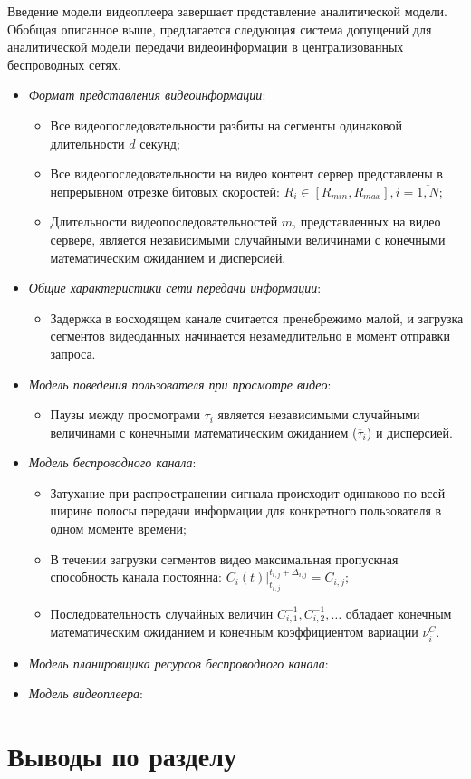 Введение модели видеоплеера завершает представление аналитической модели. Обобщая описанное выше, предлагается следующая система допущений для аналитической модели передачи видеоинформации в централизованных беспроводных сетях.
\begin{itemize}
	\item \textit{Формат представления видеоинформации}:
	\begin{itemize}
		\item Все видеопоследовательности разбиты на сегменты одинаковой длительности $d$ секунд;
		\item Все видеопоследовательности на видео контент сервер представлены в непрерывном отрезке битовых скоростей: \mbox{$R_i \in [R_{min}, R_{max}], i=\overline{1,N}$};
		\item Длительности видеопоследовательностей $m$, представленных на видео сервере, является независимыми случайными величинами с конечными математическим ожиданием и дисперсией.
	\end{itemize}
	\item \textit{Общие характеристики сети передачи информации}:
	\begin{itemize}
		\item Задержка в восходящем канале считается пренебрежимо малой, и загрузка сегментов видеоданных начинается незамедлительно в момент отправки запроса.
	\end{itemize}
	\item \textit{Модель поведения пользователя при просмотре видео}:
	\begin{itemize}
		\item Паузы между просмотрами $\tau_i$ является независимыми случайными величинами с конечными математическим ожиданием ($\overline{\tau}_i$) и дисперсией.
	\end{itemize}
	\item \textit{Модель беспроводного канала}:
	\begin{itemize}
		\item Затухание при распространении сигнала происходит одинаково по всей ширине полосы передачи информации для конкретного пользователя в одном моменте времени;
		\item В течении загрузки сегментов видео максимальная пропускная способность канала постоянна: $\left.C_i(t)\right\vert^{t_{i,j}+\Delta_{i,j}}_{t_{i,j}}=C_{i,j}$;
		\item Последовательность случайных величин $C^{-1}_{i,1}, C^{-1}_{i,2}, \ldots$ обладает конечным математическим ожиданием и конечным коэффициентом вариации $\nu^{C}_i$.
	\end{itemize}
	\item \textit{Модель планировщика ресурсов беспроводного канала}:
	\item \textit{Модель видеоплеера}:
\end{itemize}


\section{Выводы по разделу}